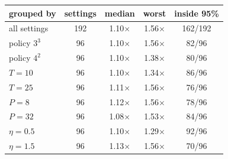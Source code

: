 \setlength{\tabcolsep}{4pt}
\begin{tabular}{@{}lcccc@{}}
\toprule
grouped by & settings & median & worst & inside 95\% \\
\midrule
all settings & 192 & 1.10$\times$ & 1.56$\times$ & 162/192 \\
\quad policy $3^{3}$ & 96 & 1.10$\times$ & 1.56$\times$ & 82/96 \\
\quad policy $4^{2}$ & 96 & 1.10$\times$ & 1.38$\times$ & 80/96 \\
\quad $T = 10$ & 96 & 1.10$\times$ & 1.34$\times$ & 86/96 \\
\quad $T = 25$ & 96 & 1.11$\times$ & 1.56$\times$ & 76/96 \\
\quad $P = 8$ & 96 & 1.12$\times$ & 1.56$\times$ & 78/96 \\
\quad $P = 32$ & 96 & 1.08$\times$ & 1.53$\times$ & 84/96 \\
\quad $\eta = 0.5$ & 96 & 1.10$\times$ & 1.29$\times$ & 92/96 \\
\quad $\eta = 1.5$ & 96 & 1.13$\times$ & 1.56$\times$ & 70/96 \\
\bottomrule
\end{tabular}